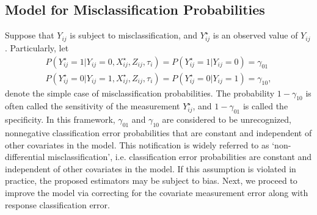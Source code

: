 \documentclass[twoside]{article}
\begin{document}
\subsection{Model for Misclassification Probabilities}\label{misprob}
Suppose that $Y_{ij}$ is subject to misclassification, and $Y_{ij}^{\star}$ is an observed value of $Y_{ij}$. Particularly, let
\begin{eqnarray}\label{c1}
P(Y_{ij}^{\star}=1|Y_{{ij}}=0,X_{ij}^{\star},Z_{ij},\tau_{i})=P(Y_{ij}^{\star}=1|Y_{ij}=0)=\gamma_{01}\\
P(Y_{ij}^{\star}=0|Y_{ij}=1,X_{ij}^{\star},Z_{ij},\tau_{i})=P(Y_{ij}^{\star}=0|Y_{ij}=1)=\gamma_{10},
\end{eqnarray}
denote the simple case of misclassification probabilities. The probability $1-\gamma _{10}$ is often called the sensitivity of the measurement $Y_{ij}^{\star}$, and $1-\gamma _{01}$ is called the specificity. In this framework, $\gamma _{01}$ and $\gamma _{10}$ are considered to be unrecognized, nonnegative classification error probabilities that are constant and 
independent of other covariates in the model. 
This notification is widely referred to as `non-differential misclassification', i.e. classification error probabilities are constant and independent of other covariates in the model. If this assumption is violated in practice, the proposed estimators may be subject to bias. 
Next, we proceed to improve the model via correcting for the covariate measurement error along with response classification error. 
\end{document}
